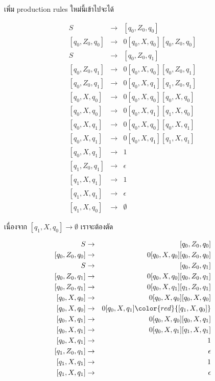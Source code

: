 \par{
เพิ่ม production rules ใหม่นี้เข้าไปจะได้

\begin{eqnarray*}
S & \rightarrow & [q_0,Z_0, q_0] \\
\left[q_0, Z_0, q_0\right] & \rightarrow & 0 [ q_0, X, q_0][q_0, Z_0, q_0] \\
%
S & \rightarrow & [q_0,Z_0, q_1] \\
\left[q_0, Z_0, q_1\right] & \rightarrow & 0 [ q_0, X, q_0][q_0, Z_0, q_1] \\
\left[q_0, Z_0, q_1\right] & \rightarrow & 0 [ q_0, X, q_1][q_1, Z_0, q_1] \\
%
\left[q_0, X, q_0\right] & \rightarrow & 0[q_0, X, q_0][q_0, X, q_0] \\
\left[q_0, X, q_0\right] & \rightarrow & 0[q_0, X, q_1][q_1, X, q_0] \\
\left[q_0, X, q_1\right] & \rightarrow & 0[q_0, X, q_0][q_0, X, q_1] \\
\left[q_0, X, q_1\right] & \rightarrow & 0[q_0, X, q_1][q_1, X, q_1] \\
%
\left[q_0, X, q_1\right] & \rightarrow & 1 \\
\left[q_1, Z_0, q_1\right] & \rightarrow & \epsilon \\
\left[q_1, X, q_1\right] & \rightarrow & 1 \\
\left[q_1, X, q_1\right] & \rightarrow & \epsilon \\
\left[q_1, X, q_0\right] & \rightarrow & \emptyset 
\end{eqnarray*}

เนื่องจาก $[q_1, X, q_0] \rightarrow \emptyset$ เราจะต้องตัด

\begin{eqnarray*}
S & \rightarrow & [q_0,Z_0, q_0] \\
\left[q_0, Z_0, q_0\right] & \rightarrow & 0 [ q_0, X, q_0][q_0, Z_0, q_0] \\
%
S & \rightarrow & [q_0,Z_0, q_1] \\
\left[q_0, Z_0, q_1\right] & \rightarrow & 0 [ q_0, X, q_0][q_0, Z_0, q_1] \\
\left[q_0, Z_0, q_1\right] & \rightarrow & 0 [ q_0, X, q_1][q_1, Z_0, q_1] \\
%
\left[q_0, X, q_0\right] & \rightarrow & 0[q_0, X, q_0][q_0, X, q_0] \\
\left[q_0, X, q_0\right] & \rightarrow & 0[q_0, X, q_1]\color{red}{[q_1, X, q_0]} \\
\left[q_0, X, q_1\right] & \rightarrow & 0[q_0, X, q_0][q_0, X, q_1] \\
\left[q_0, X, q_1\right] & \rightarrow & 0[q_0, X, q_1][q_1, X, q_1] \\
%
\left[q_0, X, q_1\right] & \rightarrow & 1 \\
\left[q_1, Z_0, q_1\right] & \rightarrow & \epsilon \\
\left[q_1, X, q_1\right] & \rightarrow & 1 \\
\left[q_1, X, q_1\right] & \rightarrow & \epsilon
\end{eqnarray*}

}
